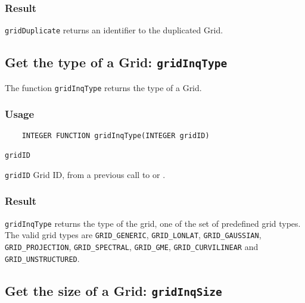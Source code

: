 \subsubsection*{Result}

{\texttt{gridDuplicate}} returns an identifier to the duplicated Grid.



\subsection{Get the type of a Grid: \texttt{gridInqType}}
\label{gridInqType}

The function {\texttt{gridInqType}} returns the type of a Grid.

\subsubsection*{Usage}

\begin{verbatim}
    INTEGER FUNCTION gridInqType(INTEGER gridID)
\end{verbatim}

\hspace*{4mm}\begin{minipage}[]{15cm}
\begin{deflist}{\texttt{gridID}\ }
\item[\texttt{gridID}]
Grid ID, from a previous call to {} or {}.

\end{deflist}
\end{minipage}

\subsubsection*{Result}

{\texttt{gridInqType}} returns the type of the grid,
one of the set of predefined {\CDI} grid types.
The valid {\CDI} grid types are {\texttt{GRID\_GENERIC}}, {\texttt{GRID\_LONLAT}},
{\texttt{GRID\_GAUSSIAN}}, {\texttt{GRID\_PROJECTION}}, {\texttt{GRID\_SPECTRAL}}, {\texttt{GRID\_GME}},
{\texttt{GRID\_CURVILINEAR}} and {\texttt{GRID\_UNSTRUCTURED}}.



\subsection{Get the size of a Grid: \texttt{gridInqSize}}
\label{gridInqSize}

